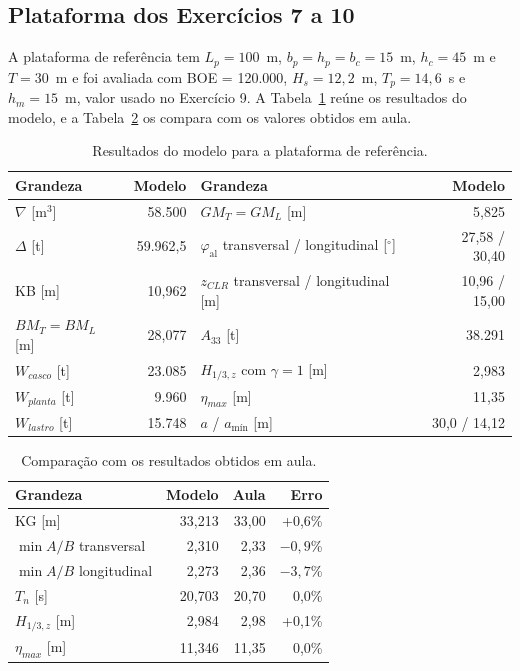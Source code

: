 \documentclass[11pt,a4paper]{article}
\newcommand{\phial}{\varphi_{\mathrm{al}}}
\newcommand{\Hz}{H_{1/3,z}}
\newcommand{\amin}{a_{\text{mín}}}
\newcommand{\Wc}{W_{casco}}
\begin{document}
\subsection{Plataforma dos Exercícios 7 a 10}

A plataforma de referência tem $L_p = 100$~m, $b_p = h_p = b_c = 15$~m, $h_c = 45$~m e
$T = 30$~m e foi avaliada com BOE = 120.000, $H_s = 12{,}2$~m, $T_p = 14{,}6$~s e $h_m = 15$~m,
valor usado no Exercício 9. A Tabela~\ref{tab:valref} reúne os resultados do modelo, e a
Tabela~\ref{tab:valaula} os compara com os valores obtidos em aula.

\begin{table}[!htb]
\centering
\caption{Resultados do modelo para a plataforma de referência.}\label{tab:valref}
\begin{tabular}{lr@{\hspace{1.2cm}}lr}
\toprule
Grandeza & Modelo & Grandeza & Modelo \\
\midrule
$\nabla$ [m$^3$] & 58.500 & $GM_T = GM_L$ [m] & 5,825 \\
$\Delta$ [t] & 59.962,5 & $\phial$ transversal / longitudinal [$^\circ$] & 27,58 / 30,40 \\
KB [m] & 10,962 & $z_{CLR}$ transversal / longitudinal [m] & 10,96 / 15,00 \\
$BM_T = BM_L$ [m] & 28,077 & $A_{33}$ [t] & 38.291 \\
$\Wc$ [t] & 23.085 & $\Hz$ com $\gamma = 1$ [m] & 2,983 \\
$W_{planta}$ [t] & 9.960 & $\eta_{max}$ [m] & 11,35 \\
$W_{lastro}$ [t] & 15.748 & $a$ / $\amin$ [m] & 30,0 / 14,12 \\
\bottomrule
\end{tabular}
\end{table}

\begin{table}[!htb]
\centering
\caption{Comparação com os resultados obtidos em aula.}\label{tab:valaula}
\begin{tabular}{lrrr}
\toprule
Grandeza & Modelo & Aula & Erro \\
\midrule
KG [m] & 33,213 & 33,00 & +0,6\% \\
$\min A/B$ transversal & 2,310 & 2,33 & $-0{,}9$\% \\
$\min A/B$ longitudinal & 2,273 & 2,36 & $-3{,}7$\% \\
$T_n$ [s] & 20,703 & 20,70 & 0,0\% \\
$\Hz$ [m] & 2,984 & 2,98 & +0,1\% \\
$\eta_{max}$ [m] & 11,346 & 11,35 & 0,0\% \\
\bottomrule
\end{tabular}
\end{table}
\end{document}
